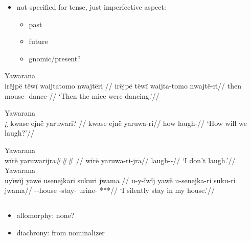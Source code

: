 \documentclass{memoir}
\begin{document}
\begin{itemize}
\tightlist
\item
  not specified for tense, just imperfective aspect:

  \begin{itemize}
  \tightlist
  \item
    past 
  \item
    future 
  \item
    gnomic/present? 
  \end{itemize}
\end{itemize}

\ex Yawarana \\
\label{ctorat-16}    \begingl
    \glpreamble  irëjpë tëwï waijtatomo nwajtëri //
    \gla irëjpë tëwï waijta-tomo nwajtë-ri//
    \glb then  mouse- dance-//
        \glft ‘Then the mice were dancing.’//  
    \endgl 
\xe

\ex Yawarana \\
\label{convrisamaj-06}    \begingl
    \glpreamble ¿ kwase ejnë yaruwari? //
    \gla kwase ejnë yaruwa-ri//
    \glb how  laugh-//
        \glft ‘How will we laugh?’//  
    \endgl 
\xe

\pex\label{gnomicri}    \a Yawarana\\
    \label{convrisamaj-04}        \begingl
        \glpreamble  wïrë yaruwarijra\#\#\# //
        \gla wïrë yaruwa-ri-jra//
        \glb {} laugh--//
            \glft ‘I don’t laugh.’//  
        \endgl 
    \a Yawarana\\
    \label{convrisamaj-28}        \begingl
        \glpreamble  uyïwïj yawë usenejkari sukuri jwama //
        \gla u-y-ïwïj yawë u-senejka-ri suku-ri jwama//
        \glb {}--house  -stay- urine- ***//
            \glft ‘I silently stay in my house.’//  
        \endgl 
\xe

\subsection{\texorpdfstring{}{}}

\begin{itemize}
\tightlist
\item
  allomorphy: none?
\item
  diachrony: from nominalizer 
\end{itemize}
\end{document}
